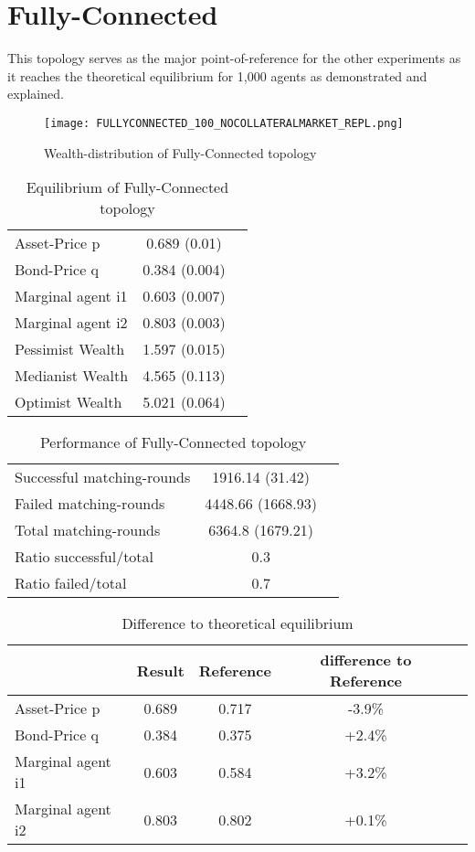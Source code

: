 \documentclass[Bachelorarbeit.tex]{subfiles}
\begin{document}
\section{Fully-Connected}
This topology serves as the major point-of-reference for the other experiments as it reaches the theoretical equilibrium for 1,000 agents as demonstrated and explained.

\begin{figure}[H]
	\centering
  \texttt{[image: FULLYCONNECTED\_100\_NOCOLLATERALMARKET\_REPL.png]}
	\caption{Wealth-distribution of Fully-Connected topology}
	\label{fig:wealth_FULLYCONNECTED_100_NOCOLLATERALMARKET_REPL}
\end{figure}

\begin{table}[H]
	\caption{Equilibrium of Fully-Connected topology}
	\centering
	\begin{tabular} { l c r }
		\hline
		Asset-Price p & 0.689 (0.01) \\
		Bond-Price q & 0.384 (0.004) \\
		Marginal agent i1 & 0.603 (0.007) \\
		Marginal agent i2 & 0.803 (0.003) \\
		\hline
		Pessimist Wealth & 1.597 (0.015) \\
		Medianist Wealth & 4.565 (0.113) \\
		Optimist Wealth & 5.021 (0.064) \\
		\hline
	\end{tabular}
	\label{tab:fullyconnected_equilibrium_100Agents_05Bond}
\end{table} 

\begin{table}[H]
	\caption{Performance of Fully-Connected topology}
	\centering
	\begin{tabular} { l c r }
		\hline
		Successful matching-rounds & 1916.14 (31.42) \\
		Failed matching-rounds & 4448.66 (1668.93) \\
		Total matching-rounds & 6364.8 (1679.21) \\
		\hline
		Ratio successful/total & 0.3 \\
		Ratio failed/total & 0.7 \\
		\hline
	\end{tabular}
\end{table}

\begin{table}[H]
	\caption{Difference to theoretical equilibrium}
	\centering
	\begin{tabular} { l c c c r }
		& Result & Reference & difference to Reference \\
		\hline
		Asset-Price p & 0.689 & 0.717 & -3.9\% \\
		Bond-Price q & 0.384 & 0.375 & +2.4\% \\
		Marginal agent i1 & 0.603  & 0.584 & +3.2\% \\
		Marginal agent i2 & 0.803 & 0.802 & +0.1\% \\
		\hline
	\end{tabular}
\end{table}
\end{document}
